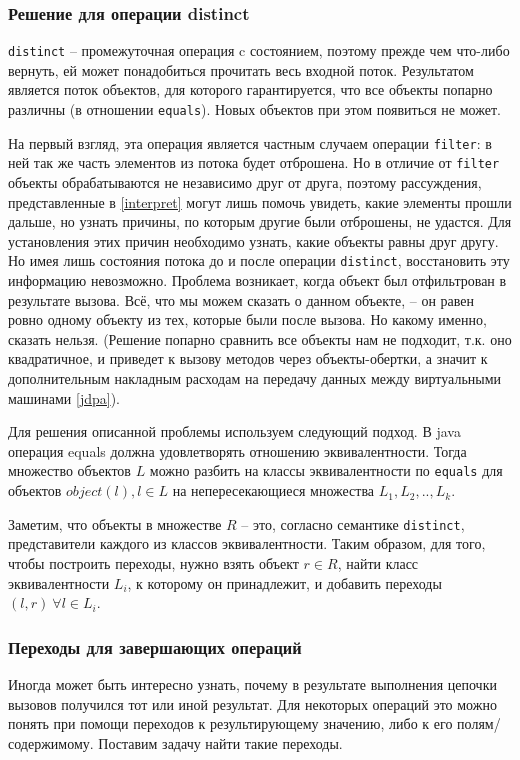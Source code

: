 \subsubsection{Решение для операции distinct}\label{distinct}
\texttt{distinct} -- промежуточная операция c состоянием, поэтому прежде чем что-либо вернуть, ей может понадобиться прочитать весь входной поток. Результатом является поток объектов, для которого гарантируется, что все объекты попарно различны (в отношении \texttt{equals}\cite{java:equals}). Новых объектов при этом появиться не может.

На первый взгляд, эта операция является частным случаем операции \texttt{filter}: в ней так же часть элементов из потока будет отброшена. Но в отличие от \texttt{filter} объекты обрабатываются не независимо друг от друга, поэтому рассуждения, представленные в \ref{interpret} могут лишь помочь увидеть, какие элементы прошли дальше, но узнать причины, по которым другие были отброшены, не удастся. Для установления этих причин необходимо узнать, какие объекты равны друг другу. Но имея лишь состояния потока до и после операции \texttt{distinct}, восстановить эту информацию невозможно. Проблема возникает, когда объект был отфильтрован в результате вызова. Всё, что мы можем сказать о данном объекте, -- он равен ровно одному объекту из тех, которые были после вызова. Но какому именно, сказать нельзя. (Решение попарно сравнить все объекты нам не подходит, т.к. оно квадратичное, и приведет к вызову методов через объекты-обертки, а значит к дополнительным накладным расходам на передачу данных между виртуальными машинами \ref{jdpa}).

Для решения описанной проблемы используем следующий подход. В java операция equals должна удовлетворять отношению эквивалентности. Тогда множество объектов $L$ можно разбить на классы эквивалентности по \texttt{equals} для объектов $object(l), l \in L$ на непересекающиеся множества $L_1, L_2, .., L_k$. 

Заметим, что объекты в множестве $R$ -- это, согласно семантике \texttt{distinct}, представители каждого из классов эквивалентности. Таким образом, для того, чтобы построить переходы, нужно взять объект $r \in R$, найти класс эквивалентности $L_i$, к которому он принадлежит, и добавить переходы $(l, r) \ \forall l \in L_i$.

\subsubsection{Переходы для завершающих операций}
Иногда может быть интересно узнать, почему в результате выполнения цепочки вызовов получился тот или иной результат. Для некоторых операций это можно понять при помощи переходов к результирующему значению, либо к его полям/содержимому. Поставим задачу найти такие переходы.

